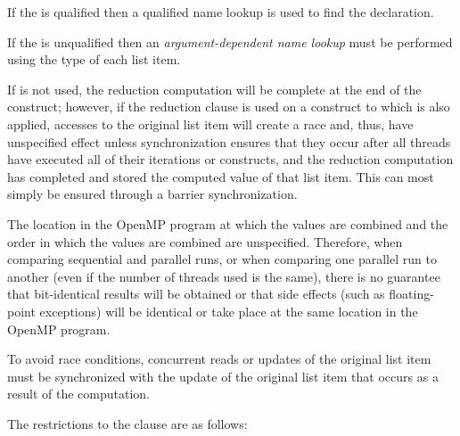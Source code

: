 If the  is qualified then a qualified name lookup is used to find the 
declaration.

If the  is unqualified then an \emph{argument-dependent name lookup} must 
be performed using the type of each list item.
\cppspecificend

If  is not used, the reduction computation will be complete at the end of the 
construct; however, if the reduction clause is used on a construct to which  is 
also applied, accesses to the original list item will create a race and, thus, have 
unspecified effect unless synchronization ensures that they occur after all threads have 
executed all of their iterations or  constructs, and the reduction computation 
has completed and stored the computed value of that list item. This can most simply be 
ensured through a barrier synchronization. 

The location in the OpenMP program at which the values are combined and the order in 
which the values are combined are unspecified. Therefore, when comparing sequential 
and parallel runs, or when comparing one parallel run to another (even if the number of 
threads used is the same), there is no guarantee that bit-identical results will be obtained 
or that side effects (such as floating-point exceptions) will be identical or take place at 
the same location in the OpenMP program.

To avoid race conditions, concurrent reads or updates of the original list item must be 
synchronized with the update of the original list item that occurs as a result of the 
 computation.

\restrictions
The restrictions to the  clause are as follows:

